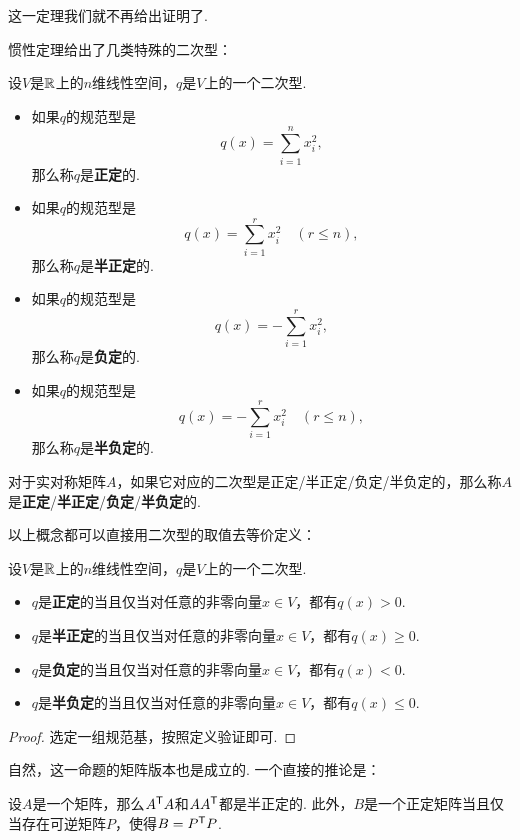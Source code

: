 这一定理我们就不再给出证明了. 

惯性定理给出了几类特殊的二次型：

\begin{definition}\label{def:positive-definite}
    设$V$是$\mathbb{R}$上的$n$维线性空间，$q$是$V$上的一个二次型. 
    \begin{itemize}
        \item 如果$q$的规范型是
        \[
            q(x)=\sum_{i=1}^n x_i^2,
        \]
        那么称$q$是\textbf{正定}的. 
        \item 如果$q$的规范型是
        \[
            q(x)=\sum_{i=1}^r x_i^2\quad(r\leq n),
        \]
        那么称$q$是\textbf{半正定}的. 
        \item 如果$q$的规范型是
        \[
            q(x)=-\sum_{i=1}^r x_i^2,
        \]
        那么称$q$是\textbf{负定}的. 
        \item 如果$q$的规范型是
        \[
            q(x)=-\sum_{i=1}^r x_i^2\quad(r\leq n),
        \]
        那么称$q$是\textbf{半负定}的. 
    \end{itemize}

对于实对称矩阵$A$，如果它对应的二次型是正定/半正定/负定/半负定的，那么称$A$是\textbf{正定}/\textbf{半正定}/\textbf{负定}/\textbf{半负定}的. 
\end{definition}

以上概念都可以直接用二次型的取值去等价定义：
\begin{proposition}\label{prop:positive-definite}
    设$V$是$\mathbb{R}$上的$n$维线性空间，$q$是$V$上的一个二次型. 
    \begin{itemize}
        \item $q$是\textbf{正定}的当且仅当对任意的非零向量$x\in V$，都有$q(x)>0$. 
        \item $q$是\textbf{半正定}的当且仅当对任意的非零向量$x\in V$，都有$q(x)\geq 0$. 
        \item $q$是\textbf{负定}的当且仅当对任意的非零向量$x\in V$，都有$q(x)<0$. 
        \item $q$是\textbf{半负定}的当且仅当对任意的非零向量$x\in V$，都有$q(x)\leq 0$. 
    \end{itemize}
\end{proposition}
\begin{proof}
    选定一组规范基，按照定义验证即可. 
\end{proof}

自然，这一命题的矩阵版本也是成立的. 一个直接的推论是：

\begin{corollary}\label{cor:positive-definite}
设$A$是一个矩阵，那么$A^{\mathsf{T}} A$和$AA^{\mathsf{T}}$都是半正定的. 此外，$B$是一个正定矩阵当且仅当存在可逆矩阵$P$，使得$B=P^{\mathsf{T}} P$.
\end{corollary}

